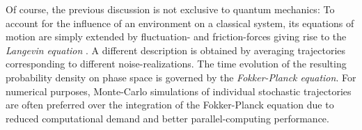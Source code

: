 Of course, the previous discussion is not exclusive to quantum mechanics:
To account for the influence of an environment on a classical system, its equations of motion are simply extended by fluctuation- and friction-forces giving rise to the \emph{Langevin equation} \cite{GaCr85_handbook}.
A different description is obtained by averaging trajectories corresponding to different noise-realizations.
The time evolution of the resulting probability density on phase space is governed by the \emph{Fokker-Planck equation}.
For numerical purposes, Monte-Carlo simulations of individual stochastic trajectories are often preferred over the integration of the Fokker-Planck equation due to reduced computational demand and better parallel-computing performance.


